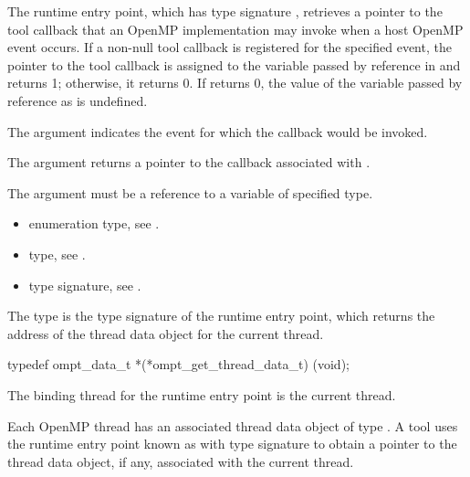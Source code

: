 \descr
The  runtime entry point, which has type signature 
, retrieves a pointer to the tool callback that
an OpenMP implementation may invoke when a host OpenMP event occurs. If a 
non-null tool callback is registered for the specified event, the pointer 
to the tool callback is assigned to the variable passed by reference in
 and  returns 1; otherwise, it returns 0. 
If  returns 0, the value of the variable passed by 
reference as  is undefined.

\argdesc
The  argument indicates the event for which the callback would 
be invoked.

The  argument returns a pointer to the callback associated 
with .

\constraints
The  argument must be a reference to a variable of specified type.

\crossreferences
\begin{itemize}
\item {} enumeration type, see .

\item {} type, see .

\item {} type signature,
see .
\end{itemize}


\label{sec:ompt_get_thread_data_t}
\label{sec:ompt_get_thread_data}

\summary
The  type is the type signature of the 
 runtime entry point, which returns the
address of the thread data object for the current thread.

\format
\begin{ccppspecific}
\begin{omptInquiry}
typedef ompt_data_t *(*ompt_get_thread_data_t) (void);
\end{omptInquiry}
\end{ccppspecific}

\binding
The binding thread for the  runtime entry 
point is the current thread.

\descr
Each OpenMP thread has an associated thread data object of type
.
A tool uses the runtime entry point known as
with type signature 
to obtain a pointer to the thread data object, if any, associated with the
current thread. 


